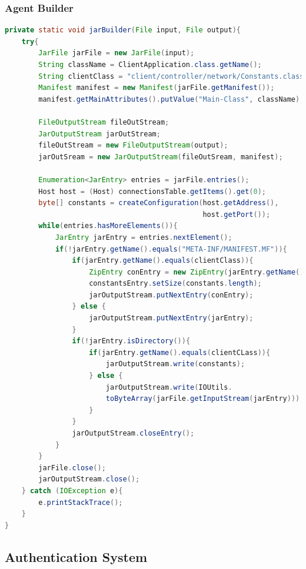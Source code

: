 \newpage

\subsubsection{Agent Builder}

\begin{lstlisting}[language=Java, style=Oracle, columns=fullflexible,
caption=Agent (Client-Side) Builder,
captionpos=b]
private static void jarBuilder(File input, File output){
    try{
        JarFile jarFile = new JarFile(input);
        String className = ClientApplication.class.getName();
        String clientClass = "client/controller/network/Constants.class";
        Manifest manifest = new Manifest(jarFile.getManifest());
        manifest.getMainAttributes().putValue("Main-Class", className);

        FileOutputStream fileOutStream;
        JarOutputStream jarOutStream;
        fileOutStream = new FileOutputStream(output);
        jarOutSream = new JarOutputStream(fileOutSream, manifest);

        Enumeration<JarEntry> entries = jarFile.entries();
        Host host = (Host) connectionsTable.getItems().get(0);
        byte[] constants = createConfiguration(host.getAddress(),
                                               host.getPort());
        while(entries.hasMoreElements()){
            JarEntry jarEntry = entries.nextElement();
            if(!jarEntry.getName().equals("META-INF/MANIFEST.MF")){
                if(jarEntry.getName().equals(clientClass)){
                    ZipEntry conEntry = new ZipEntry(jarEntry.getName());
                    constantsEntry.setSize(constants.length);
                    jarOutputStream.putNextEntry(conEntry);
                } else {
                    jarOutputStream.putNextEntry(jarEntry);
                }
                if(!jarEntry.isDirectory()){
                    if(jarEntry.getName().equals(clientCLass)){
                        jarOutputStream.write(constants);
                    } else {
                        jarOutputStream.write(IOUtils.
                        toByteArray(jarFile.getInputStream(jarEntry)));
                    }
                }
                jarOutputStream.closeEntry();
            }
        }
        jarFile.close();
        jarOutputStream.close();
    } catch (IOException e){
        e.printStackTrace();
    }
}
\end{lstlisting}

\newpage

\subsection{Authentication System}

